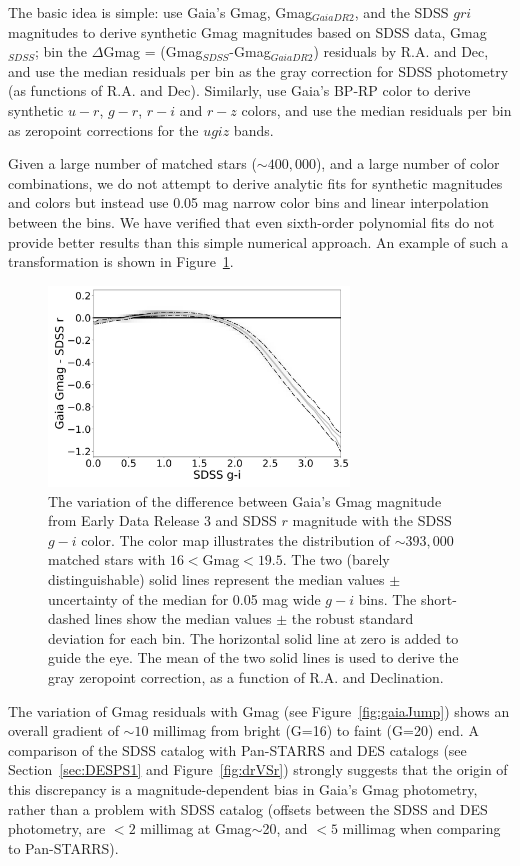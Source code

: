 \documentclass[fleqn,usenatbib]{mnras}
\begin{document}
The basic idea is simple: use Gaia's Gmag, Gmag$_{GaiaDR2}$, and the SDSS $gri$ magnitudes
to derive synthetic Gmag magnitudes based on SDSS data, Gmag$_{SDSS}$; bin the 
$\Delta$Gmag = (Gmag$_{SDSS}$-Gmag$_{GaiaDR2}$) residuals by R.A. and Dec, and 
use the median residuals per bin as the gray correction for SDSS photometry (as functions
of R.A. and Dec). Similarly, use Gaia's BP-RP color to derive synthetic $u-r$, $g-r$, $r-i$
and $r-z$ colors, and use the median residuals per bin as zeropoint corrections for 
the $ugiz$ bands. 

Given a large number of matched stars ($\sim 400,000$), and a large number of color combinations,
we do not attempt to derive analytic fits for synthetic magnitudes and colors but instead
use 0.05 mag narrow color bins and linear interpolation between the bins. We have verified
that even sixth-order polynomial fits do not provide better results than this simple 
numerical approach. An example of such a transformation is shown in Figure~\ref{fig:GrVSgi}. 


\begin{figure}[th!]
  \centering\includegraphics[width=8cm]{figures/GrVSgi.png} 
\caption{The variation of the difference between Gaia's Gmag magnitude from Early Data Release 3
and SDSS $r$ magnitude with the SDSS $g-i$ color.
The  color map illustrates the distribution of $\sim 393,000$ matched stars with 
$16<$Gmag$<19.5$. The two (barely distinguishable) solid lines represent the median 
values $\pm$ uncertainty of the median for 0.05 mag wide $g-i$ bins. The short-dashed 
lines show the median values $\pm$ the robust standard deviation for 
each bin. The horizontal solid line at zero is added to guide the eye. The mean of 
the two solid lines is used to derive the gray zeropoint correction, as a function of R.A.
and Declination.}
\label{fig:GrVSgi}
\end{figure}


The variation of Gmag residuals with Gmag (see Figure~\ref{fig:gaiaJump}) shows 
an overall gradient of $\sim10$ millimag from bright (G=16) to faint (G=20) end. 
A comparison of the SDSS catalog with Pan-STARRS and DES catalogs (see 
Section~\ref{sec:DESPS1} and Figure~\ref{fig:drVSr}) strongly suggests that the
origin of this discrepancy is a magnitude-dependent bias in Gaia's Gmag photometry,
rather than a problem with SDSS catalog (offsets between the SDSS and DES
photometry,  are $<2$ millimag at Gmag$\sim$20, and $<5$ millimag when
comparing to Pan-STARRS). 
\end{document}
